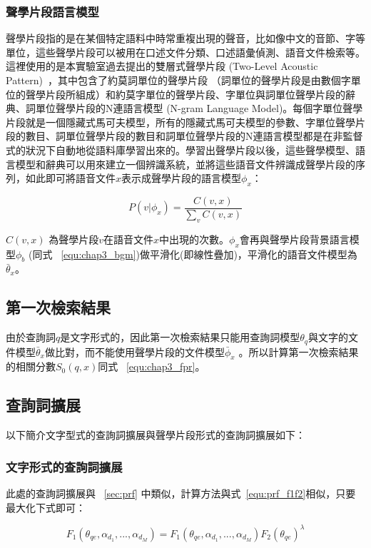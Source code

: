 \subsubsection{聲學片段語言模型}
\label{sec:chap3_apd}
聲學片段指的是在某個特定語料中時常重複出現的聲音，比如像中文的音節、字等單位，這些聲學片段可以被用在口述文件分類、口述語彙偵測、語音文件檢索等。這裡使用的是本實驗室過去提出的雙層式聲學片段 (Two-Level Acoustic Pattern)~\cite{chung2013unsupervised}，其中包含了約莫詞單位的聲學片段 （詞單位的聲學片段是由數個字單位的聲學片段所組成）和約莫字單位的聲學片段、字單位與詞單位聲學片段的辭典、詞單位聲學片段的N連語言模型 (N-gram Language
Model)。每個字單位聲學片段就是一個隱藏式馬可夫模型，所有的隱藏式馬可夫模型的參數、字單位聲學片段的數目、詞單位聲學片段的數目和詞單位聲學片段的N連語言模型都是在非監督式的狀況下自動地從語料庫學習出來的。學習出聲學片段以後，這些聲學模型、語言模型和辭典可以用來建立一個辨識系統，並將這些語音文件辨識成聲學片段的序列，如此即可將語音文件$x$表示成聲學片段的語言模型$\phi_x$：

\begin{equation}
P(v|\phi_x) = \frac{C(v, x)}{\sum_v C(v, x)}
\end{equation}

$C(v, x)$ 為聲學片段$v$在語音文件$x$中出現的次數。$\phi_x$會再與聲學片段背景語言模型$\phi_b$ (同式 ~\ref{equ:chap3_bgm})做平滑化(即線性疊加)，平滑化的語音文件模型為$\bar{\theta}_x$。

\subsection{第一次檢索結果}
由於查詢詞$q$是文字形式的，因此第一次檢索結果只能用查詢詞模型$\theta_q$與文字的文件模型$\bar{\theta}_x$做比對，而不能使用聲學片段的文件模型$\bar{\phi}_x$
。所以計算第一次檢索結果的相關分數$S_0(q, x)$同式 ~\ref{equ:chap3_fpr}。

\subsection{查詢詞擴展}
以下簡介文字型式的查詢詞擴展與聲學片段形式的查詢詞擴展如下：

\subsubsection{文字形式的查詢詞擴展}
此處的查詢詞擴展與 ~\ref{sec:prf} 中類似，計算方法與式~\ref{equ:prf_f1f2}相似，只要最大化下式即可：

\begin{equation}
\label{equ:prf_f1f2_text}
F_1(\theta_{qe}, \alpha_{d_1}, ..., \alpha_{d_M}) = F_1(\theta_{qe}, \alpha_{d_1}, ..., \alpha_{d_M}) F_2(\theta_{qe})^\lambda
\end{equation}

